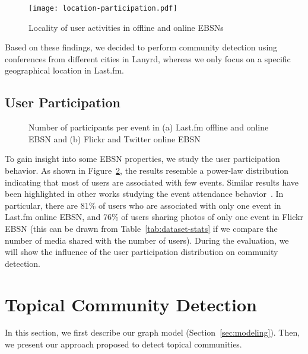 \begin{figure}[H]
  \centering
  \texttt{[image: location-participation.pdf]}
  \caption{Locality of user activities in offline and online EBSNs}
  \label{fig:event-user-distance}
\end{figure}

Based on these findings, we decided to perform community detection using conferences from different cities in Lanyrd, whereas we only focus on a specific geographical location in Last.fm. 

\subsection{User Participation}   \label{sec:network-prop}

\begin{figure}[htb]
\centering
{}
\caption{Number of participants per event in (a) Last.fm offline and online EBSN and (b) Flickr and Twitter online EBSN}
\label{fig:users-events}
\end{figure}

To gain insight into some EBSN properties, we study the user participation behavior. As shown in Figure~\ref{fig:users-events}, the results resemble a power-law distribution indicating that most of users are associated with few events. Similar results have been highlighted in other works studying the event attendance behavior~\cite{Liu:KDD12,Han:NCWTW12}. In particular, there are 81\% of users who are associated with only one event in Last.fm online EBSN, and 76\% of users sharing photos of only one event in Flickr EBSN (this can be drawn from Table~\ref{tab:dataset-stats} if we compare the number of media shared with the number of users). During the evaluation, we will show the influence of the user participation distribution on community detection.    


\section{Topical Community Detection} \label{sec:community}
In this section, we first describe our graph model (Section~\ref{sec:modeling}). Then, we present our approach proposed to detect topical communities. 

